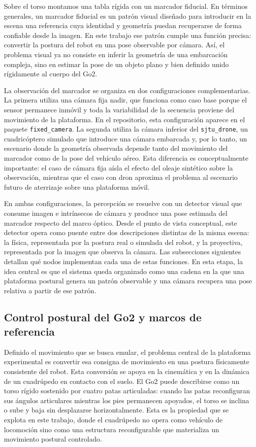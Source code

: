 \documentclass[12pt,a4paper]{report}
\begin{document}
Sobre el torso montamos una tabla rígida con un marcador fiducial. En términos
generales, un marcador fiducial es un patrón visual diseñado para introducir en
la escena una referencia cuya identidad y geometría puedan recuperarse de forma
confiable desde la imagen. En este trabajo ese patrón cumple una función
precisa: convertir la postura del robot en una pose observable por cámara. Así,
el problema visual ya no consiste en inferir la geometría de una embarcación
compleja, sino en estimar la pose de un objeto plano y bien definido unido
rígidamente al cuerpo del Go2.

La observación del marcador se organiza en dos configuraciones complementarias.
La primera utiliza una cámara fija nadir, que funciona como caso base porque el
sensor permanece inmóvil y toda la variabilidad de la secuencia proviene del
movimiento de la plataforma. En el repositorio, esta configuración aparece en
el paquete \texttt{fixed\_camera}. La segunda utiliza la cámara inferior del
\texttt{sjtu\_drone}, un cuadricóptero simulado que introduce una cámara
embarcada y, por lo tanto, un escenario donde la geometría observada depende
tanto del movimiento del marcador como de la pose del vehículo aéreo. Esta
diferencia es conceptualmente importante: el caso de cámara fija aísla el
efecto del oleaje sintético sobre la observación, mientras que el caso con dron
aproxima el problema al escenario futuro de aterrizaje sobre una plataforma
móvil.

En ambas configuraciones, la percepción se resuelve con un detector visual que
consume imagen e intrínsecos de cámara y produce una pose estimada del marcador
respecto del marco óptico. Desde el punto de vista conceptual, este detector
opera como puente entre dos descripciones distintas de la misma escena: la
física, representada por la postura real o simulada del robot, y la proyectiva,
representada por la imagen que observa la cámara. Las subsecciones siguientes
detallan qué nodos implementan cada una de estas funciones. En esta etapa, la idea central
es que el sistema queda organizado como una cadena en la que una plataforma
postural genera un patrón observable y una cámara recupera una pose relativa a
partir de ese patrón.

\subsection{Control postural del Go2 y marcos de referencia}
\label{sec:control_postural}

Definido el movimiento que se busca emular, el problema central de la plataforma
experimental es convertir esa consigna de movimiento en una postura físicamente
consistente del robot. Esta conversión se apoya en la cinemática y en la dinámica
de un cuadrúpedo en contacto con el suelo. El Go2 puede describirse como un torso
rígido sostenido por cuatro patas articuladas: cuando las patas reconfiguran sus
ángulos articulares mientras los pies permanecen apoyados, el torso se inclina o
sube y baja sin desplazarse horizontalmente. Esta es la propiedad que se explota
en este trabajo, donde el cuadrúpedo no opera como vehículo de locomoción sino
como una estructura reconfigurable que materializa un movimiento postural
controlado.
\end{document}
